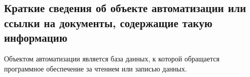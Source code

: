 \subsection{Краткие сведения об объекте автоматизации или ссылки на документы, содержащие такую информацию}

Объектом автоматизации является база данных, к которой обращается программное обеспечение за чтением или записью данных.
